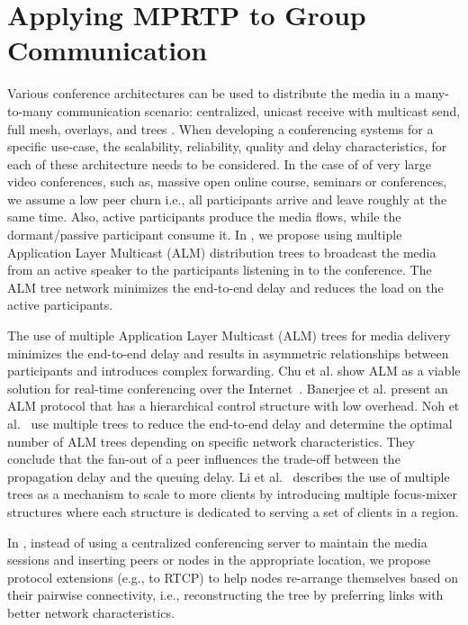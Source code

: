 \section{Applying MPRTP to Group Communication}


Various conference architectures can be used to distribute the media in a
many-to-many communication scenario: centralized, unicast receive with
multicast send, full mesh, overlays, and trees
\cite{Li2010a,Noh2008,Singh2001}. When developing a conferencing systems for a
specific use-case, the scalability, reliability, quality and delay
characteristics, for each of these architecture needs to be considered. In the
case of of very large video conferences, such as, massive open online course,
seminars or conferences, we assume a low peer churn i.e., all participants
arrive and leave roughly at the same time. Also, active participants produce
the media flows, while the dormant/passive participant consume it. In
\cite{Globisch:AsymGrpComm}, we propose using multiple Application Layer
Multicast (ALM) distribution trees to broadcast the media from an active
speaker to the participants listening in to the conference. The ALM tree
network minimizes the end-to-end delay and reduces the load on the active
participants.

The use of multiple Application Layer Multicast (ALM) trees for media delivery
minimizes the end-to-end delay and results in asymmetric relationships between
participants and introduces complex forwarding. Chu et al. show ALM as a
viable solution for real-time conferencing over the Internet~\cite{Chu2001}.
Banerjee et al.\cite{Banerjee2002} present an ALM protocol that has a
hierarchical control structure with low overhead. Noh et al.~\cite{Noh2008}
use multiple trees to reduce the end-to-end delay and determine the optimal
number of ALM trees depending on specific network characteristics. They
conclude that the fan-out of a peer influences the trade-off between the
propagation delay and the queuing delay. Li et al.~\cite{Li2010a} describes
the use of multiple trees as a mechanism to scale to more clients by
introducing multiple focus-mixer structures where each structure is dedicated
to serving a set of clients in a region.

In \cite{draft.rtcp.overlay}, instead of using a centralized conferencing
server to maintain the media sessions and inserting peers or nodes in the
appropriate location, we propose protocol extensions (e.g., to RTCP) to help
nodes re-arrange themselves based on their pairwise connectivity, i.e.,
reconstructing the tree by preferring links with better network
characteristics.

